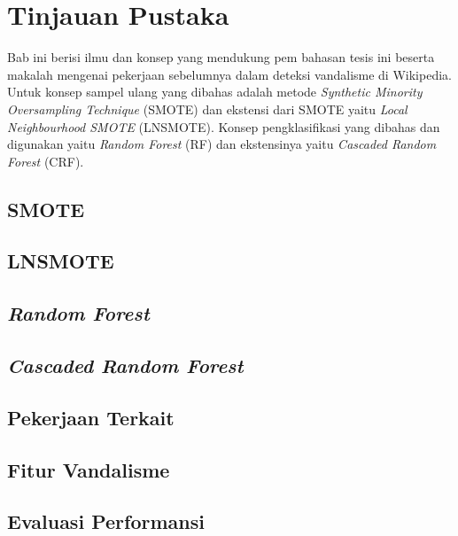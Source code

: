\chapter{Tinjauan Pustaka}
\label{bab:02}

Bab ini berisi ilmu dan konsep yang mendukung pem bahasan tesis ini beserta
makalah mengenai pekerjaan sebelumnya dalam deteksi vandalisme di Wikipedia.
Untuk konsep sampel ulang yang dibahas adalah metode \textit{Synthetic Minority
Oversampling Technique} (SMOTE) dan ekstensi dari SMOTE yaitu
\textit{Local Neighbourhood SMOTE} (LNSMOTE).
Konsep pengklasifikasi yang dibahas dan digunakan yaitu \textit{Random Forest}
(RF) dan ekstensinya yaitu \textit{Cascaded Random Forest} (CRF).

	\section{SMOTE}
	\label{bab:02:smote}
	

	\section{LNSMOTE}
	\label{bab:02:lnsmote}
	

	\section{\textit{Random Forest}}
	\label{bab:02:rf}
	

	\section{\textit{Cascaded Random Forest}}
	\label{bab:02:crf}
	

	\section{Pekerjaan Terkait}\label{bab:02:pekerjaan_terkait}
	

	\section{Fitur Vandalisme}
	\label{bab:02:fitur_vandalisme}
	

	\section{Evaluasi Performansi}
	
